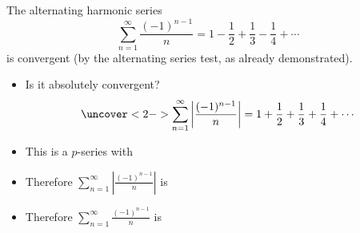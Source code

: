 \begin{frame}
\begin{example} %
The alternating harmonic series
\abovedisplayskip=0pt
\belowdisplayskip=0pt
\[
\sum_{n=1}^\infty \frac{(-1)^{n-1}}{n} = 1 - \frac{1}{2} + \frac{1}{3} - \frac{1}{4} + \cdots%
\]
is convergent (by the alternating series test, as already demonstrated).
\begin{itemize}
\item<2->  Is it absolutely convergent?
\[
\uncover<2->{%
\sum_{n=1}^\infty \left| \frac{(-1)^{n-1}}{n}\right|  = 1 + \frac{1}{2} + \frac{1}{3} + \frac{1}{4} + \cdots%
}%
\]
\item<3->  This is a $p$-series with 
\item<5->  Therefore $\sum_{n=1}^\infty \left|\frac{(-1)^{n-1}}{n}\right|$ is 
\item<5->  Therefore $\sum_{n=1}^\infty \frac{(-1)^{n-1}}{n}$ is 
\end{itemize}
\end{example}
\end{frame}
